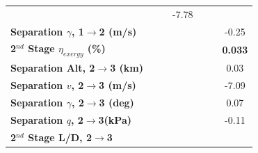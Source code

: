 \begin{table}[ht]
\begin{tabular}{l c c c c c c}
		& \firstsecondSeparationvmThreeOneHundredFiveNoReturn
		& \firstsecondSeparationvmThreeOneHundredTenNoReturn
		&-7.78
		\\
		\textbf{Separation $\gamma$, 1$\rightarrow$2 (m/s)}
		& \firstsecondSeparationgammamThreeNinetyNoReturn
		& \firstsecondSeparationgammamThreeNinetyFiveNoReturn
		& \firstsecondSeparationgammamThreeStandardNoReturn
		& \firstsecondSeparationgammamThreeOneHundredFiveNoReturn
		& \firstsecondSeparationgammamThreeOneHundredTenNoReturn
		&-0.25
		\\
		\hline 
		\textbf{2$^{nd}$ Stage $\eta_{exergy}$ (\%)}
		& \textbf{\secondExergyEffmThreeNinetyNoReturn}
		& \textbf{\secondExergyEffmThreeNinetyFiveNoReturn}
		& \textbf{\secondExergyEffmThreeStandardNoReturn}
		& \textbf{\secondExergyEffmThreeOneHundredFiveNoReturn}
		& \textbf{\secondExergyEffmThreeOneHundredTenNoReturn}
		& \textbf{0.033}
		\\
		\textbf{Separation Alt, 2$\rightarrow$3 (km)}
		& \secondthirdSeparationAltmThreeNinetyNoReturn
		& \secondthirdSeparationAltmThreeNinetyFiveNoReturn
		& \secondthirdSeparationAltmThreeStandardNoReturn
		& \secondthirdSeparationAltmThreeOneHundredFiveNoReturn
		& \secondthirdSeparationAltmThreeOneHundredTenNoReturn
		&0.03
		\\
		\textbf{Separation $v$, 2$\rightarrow$3 (m/s)}
		& \secondthirdSeparationvmThreeNinetyNoReturn
		& \secondthirdSeparationvmThreeNinetyFiveNoReturn
		& \secondthirdSeparationvmThreeStandardNoReturn
		& \secondthirdSeparationvmThreeOneHundredFiveNoReturn
		& \secondthirdSeparationvmThreeOneHundredTenNoReturn
		&-7.09
		\\
		\textbf{Separation $\gamma$, 2$\rightarrow$3 (deg)}
		& \secondthirdSeparationgammamThreeNinetyNoReturn
		& \secondthirdSeparationgammamThreeNinetyFiveNoReturn
		& \secondthirdSeparationgammamThreeStandardNoReturn
		& \secondthirdSeparationgammamThreeOneHundredFiveNoReturn
		& \secondthirdSeparationgammamThreeOneHundredTenNoReturn
		&0.07
		\\
		\textbf{Separation $q$, 2$\rightarrow$3(kPa)}
		& \secondthirdSeparationqmThreeNinetyNoReturn
		& \secondthirdSeparationqmThreeNinetyFiveNoReturn
		& \secondthirdSeparationqmThreeStandardNoReturn
		& \secondthirdSeparationqmThreeOneHundredFiveNoReturn
		& \secondthirdSeparationqmThreeOneHundredTenNoReturn
		&-0.11
		\\
		\textbf{2$^{nd}$ Stage L/D, 2$\rightarrow$3}
		& \secondthirdSeparationLDmThreeNinetyNoReturn
		& \secondthirdSeparationLDmThreeNinetyFiveNoReturn
		& \secondthirdSeparationLDmThreeStandardNoReturn

\end{tabular}
\end{table}
